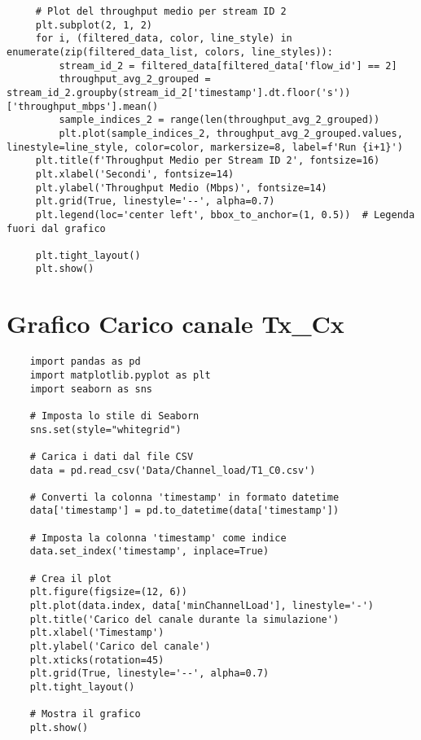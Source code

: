 \begin{lstlisting}
     # Plot del throughput medio per stream ID 2
     plt.subplot(2, 1, 2)
     for i, (filtered_data, color, line_style) in enumerate(zip(filtered_data_list, colors, line_styles)):
         stream_id_2 = filtered_data[filtered_data['flow_id'] == 2]
         throughput_avg_2_grouped = stream_id_2.groupby(stream_id_2['timestamp'].dt.floor('s'))['throughput_mbps'].mean()
         sample_indices_2 = range(len(throughput_avg_2_grouped))
         plt.plot(sample_indices_2, throughput_avg_2_grouped.values, linestyle=line_style, color=color, markersize=8, label=f'Run {i+1}')
     plt.title(f'Throughput Medio per Stream ID 2', fontsize=16)
     plt.xlabel('Secondi', fontsize=14)
     plt.ylabel('Throughput Medio (Mbps)', fontsize=14)
     plt.grid(True, linestyle='--', alpha=0.7)
     plt.legend(loc='center left', bbox_to_anchor=(1, 0.5))  # Legenda fuori dal grafico
     
     plt.tight_layout()
     plt.show()     
\end{lstlisting}

\section{Grafico Carico canale Tx\_Cx}
\label{plot_test_load}
\begin{lstlisting}
    import pandas as pd
    import matplotlib.pyplot as plt
    import seaborn as sns
    
    # Imposta lo stile di Seaborn
    sns.set(style="whitegrid")
    
    # Carica i dati dal file CSV
    data = pd.read_csv('Data/Channel_load/T1_C0.csv')
    
    # Converti la colonna 'timestamp' in formato datetime
    data['timestamp'] = pd.to_datetime(data['timestamp'])
    
    # Imposta la colonna 'timestamp' come indice
    data.set_index('timestamp', inplace=True)
    
    # Crea il plot
    plt.figure(figsize=(12, 6))
    plt.plot(data.index, data['minChannelLoad'], linestyle='-')
    plt.title('Carico del canale durante la simulazione')
    plt.xlabel('Timestamp')
    plt.ylabel('Carico del canale')
    plt.xticks(rotation=45)
    plt.grid(True, linestyle='--', alpha=0.7)
    plt.tight_layout()
    
    # Mostra il grafico
    plt.show()
\end{lstlisting}